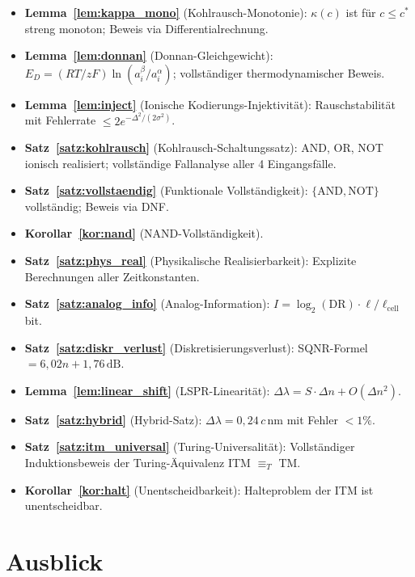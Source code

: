 ﻿\documentclass[a4paper,12pt]{article}
\theoremstyle{plain}
\theoremstyle{definition}
\theoremstyle{remark}
\begin{document}
\begin{itemize}
    \item \textbf{Lemma~\ref{lem:kappa_mono}} (Kohlrausch-Monotonie):
          $\kappa(c)$ ist f\"ur $c \leq c^*$ streng monoton; Beweis via Differentialrechnung.
    \item \textbf{Lemma~\ref{lem:donnan}} (Donnan-Gleichgewicht):
          $E_D = (RT/zF)\ln(a_i^\beta/a_i^\alpha)$; vollst\"andiger thermodynamischer Beweis.
    \item \textbf{Lemma~\ref{lem:inject}} (Ionische Kodierungs-Injektivit\"at):
          Rauschstabilit\"at mit Fehlerrate $\leq 2e^{-\Delta^2/(2\sigma^2)}$.
    \item \textbf{Satz~\ref{satz:kohlrausch}} (Kohlrausch-Schaltungssatz):
          AND, OR, NOT ionisch realisiert; vollst\"andige Fallanalyse aller 4 Eingangsf\"alle.
    \item \textbf{Satz~\ref{satz:vollstaendig}} (Funktionale Vollst\"andigkeit):
          $\{\mathrm{AND}, \mathrm{NOT}\}$ vollst\"andig; Beweis via DNF.
    \item \textbf{Korollar~\ref{kor:nand}} (NAND-Vollst\"andigkeit).
    \item \textbf{Satz~\ref{satz:phys_real}} (Physikalische Realisierbarkeit):
          Explizite Berechnungen aller Zeitkonstanten.
    \item \textbf{Satz~\ref{satz:analog_info}} (Analog-Information):
          $I = \log_2(\mathrm{DR}) \cdot \ell/\ell_{\mathrm{cell}}$ bit.
    \item \textbf{Satz~\ref{satz:diskr_verlust}} (Diskretisierungsverlust):
          SQNR-Formel $= 6{,}02n + 1{,}76\,\mathrm{dB}$.
    \item \textbf{Lemma~\ref{lem:linear_shift}} (LSPR-Linearit\"at):
          $\Delta\lambda = S \cdot \Delta n + O(\Delta n^2)$.
    \item \textbf{Satz~\ref{satz:hybrid}} (Hybrid-Satz):
          $\Delta\lambda = 0{,}24\,c\,\mathrm{nm}$ mit Fehler $< 1\%$.
    \item \textbf{Satz~\ref{satz:itm_universal}} (Turing-Universalit\"at):
          Vollst\"andiger Induktionsbeweis der Turing-\"Aquivalenz ITM $\equiv_T$ TM.
    \item \textbf{Korollar~\ref{kor:halt}} (Unentscheidbarkeit):
          Halteproblem der ITM ist unentscheidbar.
\end{itemize}

\section{Ausblick}
\end{document}
